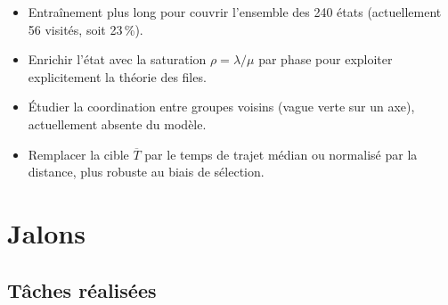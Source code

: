 \documentclass[a4paper,10pt]{article}
\begin{document}
\begin{itemize}[leftmargin=1.5em,itemsep=0pt]
  \item Entra\^{i}nement plus long pour couvrir l'ensemble des 240 \'{e}tats
        (actuellement 56 visit\'{e}s, soit 23\,\%).
  \item Enrichir l'\'{e}tat avec la saturation $\rho = \lambda / \mu$ par
        phase pour exploiter explicitement la th\'{e}orie des files.
  \item \'{E}tudier la coordination entre groupes voisins (\og vague verte \fg{}
        sur un axe), actuellement absente du mod\`{e}le.
  \item Remplacer la cible $\overline{T}$ par le temps de trajet m\'{e}dian
        ou normalis\'{e} par la distance, plus robuste au biais de s\'{e}lection.
\end{itemize}

\section{Jalons}

\subsection{T\^{a}ches r\'{e}alis\'{e}es}
\end{document}
